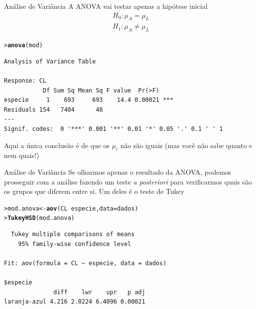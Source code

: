 \documentclass[10pt]{beamer}\usepackage{graphicx, color}
\makeatletter
\newcommand{\hlfunctioncall}[1]{\textcolor[rgb]{0,0,0.545098039215686}{\textbf{#1}}}%
\newenvironment{kframe}{%
 \def\at@end@of@kframe{}%
 \ifinner\ifhmode%
  \def\at@end@of@kframe{\end{minipage}}%
  \begin{minipage}{\columnwidth}%
 \fi\fi%
 \def\FrameCommand##1{\hskip\@totalleftmargin \hskip-\fboxsep
 \colorbox{shadecolor}{##1}\hskip-\fboxsep
     \hskip-\linewidth \hskip-\@totalleftmargin \hskip\columnwidth}%
 \MakeFramed {\advance\hsize-\width
   \@totalleftmargin\z@ \linewidth\hsize
   \@setminipage}}%
 {\par\unskip\endMakeFramed%
 \at@end@of@kframe}
\newenvironment{knitrout}{}{} %
\makeatother
\begin{document}
\begin{frame}[fragile=singleslide]{Análise de Variância}
A ANOVA vai testar apenas a hipótese inicial
\begin{align*}
  &H_0: \mu_A = \mu_L \\
  &H_1: \mu_A \neq \mu_L
\end{align*}
\begin{knitrout}\small
{}\color{fgcolor}\begin{kframe}
\begin{alltt}
> \hlfunctioncall{anova}(mod)
\end{alltt}
\begin{verbatim}
Analysis of Variance Table

Response: CL
           Df Sum Sq Mean Sq F value  Pr(>F)    
especie     1    693     693    14.4 0.00021 ***
Residuals 154   7404      48                    
---
Signif. codes:  0 '***' 0.001 '**' 0.01 '*' 0.05 '.' 0.1 ' ' 1 
\end{verbatim}
\end{kframe}
\end{knitrout}

Aqui a única conclusão é de que os $\mu_i$ não são iguais (mas você
não sabe quanto e nem quais!)
\end{frame}

\begin{frame}[fragile=singleslide]{Análise de Variância}
Se olharmos apenas o resultado da ANOVA, podemos prosseguir com a
análise fazendo um teste \textit{a posteriori} para verificarmos quais
são os grupos que diferem entre si. Um deles é o teste de Tukey
\begin{knitrout}\small
{}\color{fgcolor}\begin{kframe}
\begin{alltt}
> mod.anova <- \hlfunctioncall{aov}(CL ~ especie, data = dados)
> \hlfunctioncall{TukeyHSD}(mod.anova)
\end{alltt}
\begin{verbatim}
  Tukey multiple comparisons of means
    95% family-wise confidence level

Fit: aov(formula = CL ~ especie, data = dados)

$especie
              diff    lwr    upr   p adj
laranja-azul 4.216 2.0224 6.4096 0.00021

\end{verbatim}
\end{kframe}
\end{knitrout}

\end{frame}
\end{document}
